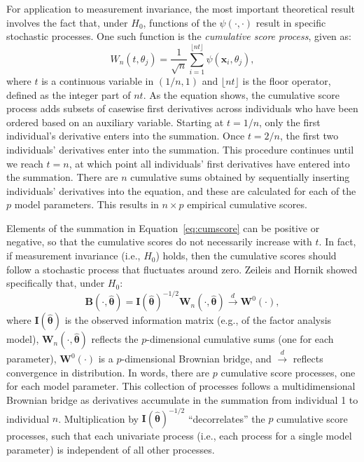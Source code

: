 \documentclass[man]{apa}
\begin{document}
For application to measurement invariance, the most important
theoretical result involves the fact that, under $H_0$, functions of
the $\psi(\cdot, \cdot)$ result in specific stochastic
processes.  One such function
is the {\em{cumulative score process}}, given as:
\begin{equation}
    \label{eq:cumscore}
    W_n(t,\theta_j) = \frac{1}{\sqrt{n}} \sum_{i=1}^{\lfloor nt
      \rfloor} \psi ({\bm{x}}_i, \theta_j),
\end{equation}
where $t$ is a continuous variable in $(1/n,1)$ and $\lfloor nt
\rfloor$ is the floor operator, defined as the integer part of
$nt$.
As the equation shows, the cumulative score process adds subsets of
casewise first derivatives across individuals who have been ordered
based on an auxiliary variable.  Starting at $t=1/n$, only the
first individual's derivative enters into the summation.  Once
$t=2/n$, the first two individuals' derivatives enter into the
summation.  This procedure continues until we reach $t=n$, at which
point all individuals' first derivatives have entered into the
summation.  There are $n$ cumulative sums obtained by sequentially
inserting individuals' derivatives into the equation, and these are
calculated 
for each of the $p$ model parameters.  This results
in $n\times p$
empirical cumulative scores.

Elements of the summation in Equation~\eqref{eq:cumscore}
can be positive or 
negative, so that the cumulative scores do not necessarily increase
with $t$.  In fact, if measurement invariance (i.e., $H_0$) holds,
then the cumulative scores should 
follow a stochastic process that fluctuates around zero.  
Zeileis and Hornik \citeyear{ZeiHor07} showed specifically that, under
$H_0$:
\begin{equation}
    \label{eq:browbridge}
{\bm{B}}(\cdot, \widehat{{\bm{\theta}}}) = {\bm{I}}(\widehat{{\bm{\theta}}})^{-1/2}{\bm{W}}_n(\cdot,\widehat{{\bm{\theta}}})
\overset{d}{\rightarrow} {\bm W}^{0}(\cdot), %
\end{equation}
where ${\bm{I}}(\widehat{{\bm{\theta}}})$ is the observed information
matrix (e.g., of the factor analysis model), ${\bm{W}}_n(\cdot,\widehat{{\bm{\theta}}})$ reflects the $p$-dimensional
cumulative sums (one for each parameter), ${\bm W}^{0}(\cdot)$ is a
$p$-dimensional Brownian bridge, and 
$\overset{d}{\rightarrow}$ reflects convergence in distribution. %
In words, there are $p$ cumulative score processes, one for each
model parameter.  This collection of processes follows a
multidimensional Brownian bridge as derivatives accumulate in the 
summation from individual 1 to individual $n$.
Multiplication by ${\bm{I}}(\widehat{{\bm{\theta}}})^{-1/2}$ 
``decorrelates'' the $p$
cumulative score processes, such that each univariate process (i.e., each
process for a single model parameter) is independent of all other
processes.
\end{document}
